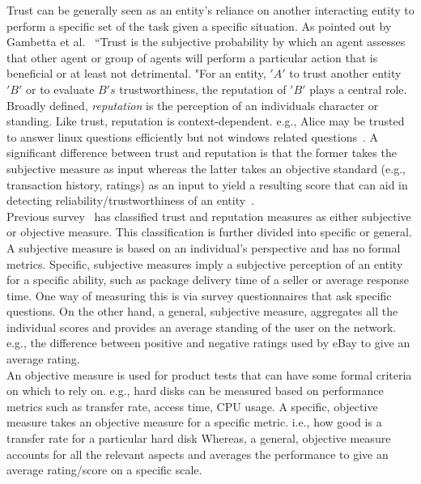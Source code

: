 Trust can be generally seen as an entity's reliance on another interacting
entity to perform a specific set of the task given a specific situation.  As
pointed out by Gambetta et al.~\cite{gambetta2000can} ``Trust is the subjective
probability by which an agent assesses that other agent or group of agents will
perform a particular action that is beneficial or at least not detrimental.
"For an entity, $'A'$ to trust another entity ${'B'}$ or to evaluate $B's$
trustworthiness, the reputation of ${'B'}$ plays a central role. Broadly
defined, \textit{reputation} is the perception of an individuals character or standing.
Like trust, reputation is context-dependent. e.g., Alice may be trusted to
answer linux questions efficiently but not windows related
questions~\cite{zacharia2000collaborative}. A significant difference between
trust and reputation is that the former takes the subjective measure as input
whereas the latter takes an objective standard (e.g., transaction history,
ratings) as an input to yield a resulting score that can aid in detecting
reliability/trustworthiness of an
entity~\cite{Sabater2005,castelfranchi2000trust}. \\

Previous survey~\cite{ josang2007survey} has classified trust and reputation
measures as either subjective or objective measure. This classification is
further divided into specific or general. A subjective measure is based on an
individual's perspective and has no formal metrics.  Specific, subjective
measures imply a subjective perception of an entity for a specific ability,
such as package delivery time of a seller or average response time. One way of
measuring this is via survey questionnaires that ask specific questions. On the
other hand, a general, subjective measure, aggregates all the individual scores
and provides an average standing of the user on the network.  e.g., the
difference between positive and negative ratings used by eBay to give an
average rating.\\
An objective measure is used for product tests that can have some formal
criteria on which to rely on. e.g., hard disks can be measured based on
performance metrics such as transfer rate, access time, CPU usage. A specific,
objective measure takes an objective measure for a specific metric. i.e., how
good is a transfer rate for a particular hard disk Whereas, a general,
objective measure accounts for all the relevant aspects and averages the
performance to give an average rating/score on a specific scale. \\

